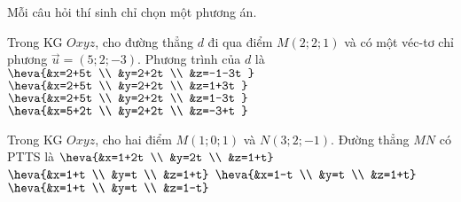 %

\TN
Mỗi câu hỏi thí sinh chỉ chọn một phương án.
\begin{ex}%
	Trong KG $Oxyz$, cho đường thẳng $d$ đi qua điểm $M(2; 2; 1)$ và có một véc-tơ chỉ phương $\overrightarrow{u}=(5; 2;-3)$. Phương trình của $d$ là
	\choice
	{$\heva{&x=2+5t \\
			&y=2+2t \\
			&z=-1-3t
		}$}
	{$\heva{&x=2+5t \\
			&y=2+2t \\
			&z=1+3t
		}$}
	{\True $\heva{&x=2+5t \\
			&y=2+2t \\
			&z=1-3t
		}$}
	{$\heva{&x=5+2t \\
			&y=2+2t \\
			&z=-3+t
		}$}
\end{ex}
\begin{ex}%
	Trong KG $Oxyz$, cho hai điểm $M(1; 0; 1)$ và $N(3; 2;-1)$. Đường thẳng $MN$ có PTTS là
	\choice
	{$\heva{&x=1+2t \\
			&y=2t \\
			&z=1+t}$}
	{$\heva{&x=1+t \\
			&y=t \\
			&z=1+t}$}
	{$\heva{&x=1-t \\
			&y=t \\
			&z=1+t}$}
	{\True $\heva{&x=1+t \\
			&y=t \\
			&z=1-t}$}
\end{ex}
